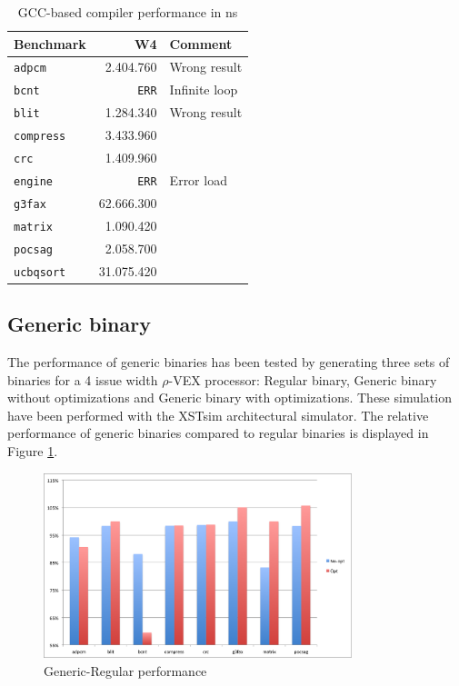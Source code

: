 \begin{table}
  \centering
    \begin{tabular}{|l|r|l|}
    \hline
    \textbf{Benchmark} & \multicolumn{1}{|r|}{\textbf{W4}} & \textbf{Comment} \\ \hline
	\texttt{adpcm} 		& 2.404.760 	&	Wrong result 	\\ \hline
	\texttt{bcnt} 		& \texttt{ERR}	&	Infinite loop	\\ \hline
	\texttt{blit} 		& 1.284.340 	&	Wrong result 	\\ \hline
	\texttt{compress} 	& 3.433.960 	&	\\ \hline
	\texttt{crc} 		& 1.409.960 	&	\\ \hline
	\texttt{engine} 	& \texttt{ERR}	&	Error load		\\ \hline
	\texttt{g3fax} 		& 62.666.300 	&	\\ \hline
	\texttt{matrix} 	& 1.090.420 	&	\\ \hline
	\texttt{pocsag} 	& 2.058.700 	&	\\ \hline
	\texttt{ucbqsort} 	& 31.075.420 	&	\\ \hline
    \end{tabular}
  \caption{GCC-based compiler performance in ns}
  \label{tbl:GCC_perf}
\end{table}

\subsection{Generic binary}
The performance of generic binaries has been tested by generating three sets of binaries for a 4 issue width $\rho$-VEX processor: Regular binary, Generic binary without optimizations and Generic binary with optimizations. These simulation have been performed with the XSTsim architectural simulator. The relative performance of generic binaries compared to regular binaries is displayed in Figure \ref{fig:rel_gen}.

\begin{figure}[ht]
\centering
\includegraphics[width=0.8\textwidth]{5_results/img/rel_gen.png}
\caption{Generic-Regular performance}
\label{fig:rel_gen}
\end{figure}

